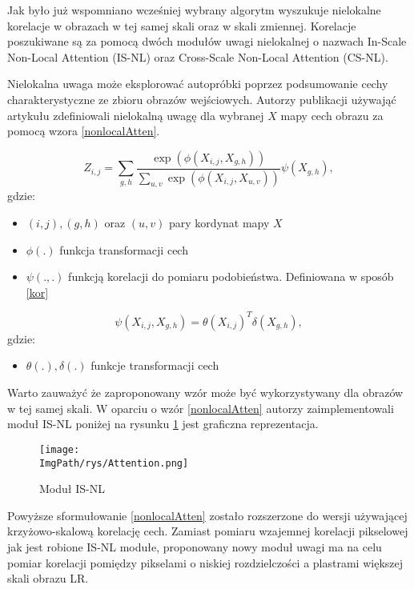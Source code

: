 \documentclass[a4paper,12pt,twoside,openany]{report}
\newcommand{\ImgPath}{.}
\begin{document}
	Jak było już wspomniano wcześniej wybrany algorytm wyszukuje nielokalne korelacje w obrazach w tej samej skali oraz w skali zmiennej. Korelacje poszukiwane są za pomocą dwóch modułów uwagi nielokalnej o nazwach  In-Scale Non-Local Attention (IS-NL) oraz Cross-Scale Non-Local Attention (CS-NL).
	
	Nielokalna uwaga może eksplorować autopróbki poprzez podsumowanie cechy charakterystyczne ze zbioru obrazów wejściowych. Autorzy publikacji używająć artykułu zdefiniowali nielokalną uwagę dla wybranej $X$ mapy cech obrazu za pomocą wzora \ref{nonlocalAtten}.
	
	\begin{equation}
		Z_{i,j}= \sum_{g,h}\frac{\exp (\phi(X_{i,j},X_{g,h}))}{\sum_{u,v}\exp(\phi(X_{i,j},X_{u,v}))} \psi(X_{g,h}),
		\label{nonlocalAtten}
	\end{equation}
	gdzie: 
	\begin{itemize}
		\item $(i,j),(g,h)$ oraz $(u,v)$ pary kordynat mapy $X$
		\item $\phi(.)$ funkcja transformacji cech
		\item $\psi(.,.)$ funkcją korelacji do pomiaru podobieństwa. Definiowana w sposób \ref{kor}
	\end{itemize}
	\begin{equation}
		\psi(X_{i,j},X_{g,h}) = \theta(X_{i,j})^T \delta(X_{g,h}),
		\label{kor}
	\end{equation}
	gdzie: 
	\begin{itemize}
		\item $\theta(.), \delta(.)$ funkcje transformacji cech
	\end{itemize}

	Warto zauważyć że zaproponowany wzór może być wykorzystywany dla obrazów w tej samej skali. W oparciu o wzór \ref{nonlocalAtten} autorzy zaimplementowali moduł IS-NL poniżej na rysunku \ref{IS-NL} jest graficzna reprezentacja.
	
	\begin{figure}[!htbp]
		\begin{center}
			\centering
			\texttt{[image: \\ImgPath/rys/Attention.png]}
		\end{center}
		\caption{Moduł IS-NL}
		\label{IS-NL}
	\end{figure}

	Powyższe sformułowanie \ref{nonlocalAtten} zostało rozszerzone do wersji używającej krzyżowo-skalową korelację cech. Zamiast pomiaru wzajemnej korelacji pikselowej jak jest robione IS-NL modułe, proponowany nowy moduł uwagi ma na celu pomiar korelacji pomiędzy pikselami o niskiej rozdzielczości a plastrami  większej skali obrazu LR. 
	
\end{document}
